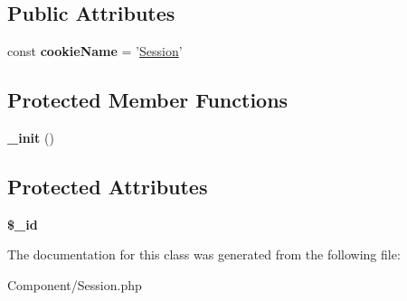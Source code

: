 \subsection*{Public Attributes}
\begin{DoxyCompactItemize}
\item 
\hypertarget{classSession_a11be3c09c8b8328f776ab418bd918ba0}{
const {\bfseries cookieName} = '\hyperlink{classSession}{Session}'}
\label{classSession_a11be3c09c8b8328f776ab418bd918ba0}

\end{DoxyCompactItemize}
\subsection*{Protected Member Functions}
\begin{DoxyCompactItemize}
\item 
\hypertarget{classSession_a43eb64d79c4a35638f2d64265de4aa56}{
{\bfseries \_\-init} ()}
\label{classSession_a43eb64d79c4a35638f2d64265de4aa56}

\end{DoxyCompactItemize}
\subsection*{Protected Attributes}
\begin{DoxyCompactItemize}
\item 
\hypertarget{classSession_a4854a1f2ded7eb0c5e9c66f2830f92d6}{
{\bfseries \$\_\-id}}
\label{classSession_a4854a1f2ded7eb0c5e9c66f2830f92d6}

\end{DoxyCompactItemize}


The documentation for this class was generated from the following file:\begin{DoxyCompactItemize}
\item 
Component/Session.php\end{DoxyCompactItemize}
